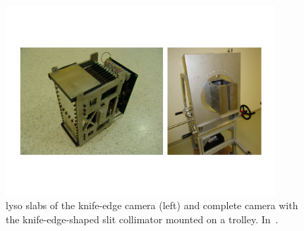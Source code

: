 \begin{figure}[!htbp]
\centering
\includegraphics[width=0.9\textwidth]{03_GraphicFiles/chapter2_GammaCameras/knife_edge_IBA.pdf}
\caption{\gls{lyso} slabs of the knife-edge camera (left) and complete camera with the knife-edge-shaped slit collimator mounted on a trolley. In~\cite{Priegnitz2015}.}
\label{chap2::fig::KE_IBA}
\end{figure}  

